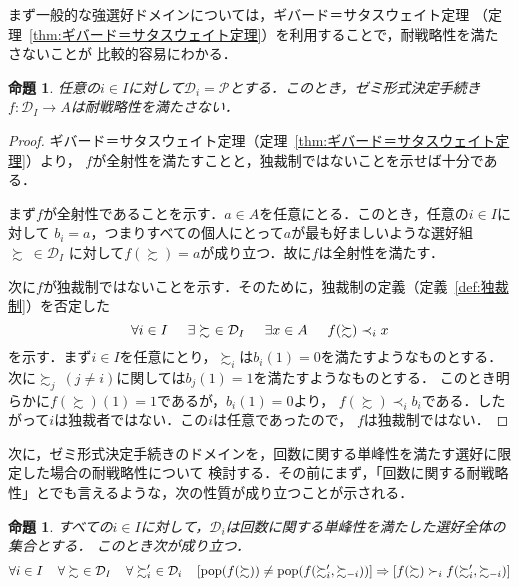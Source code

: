 \documentclass[dvipdfmx]{jsarticle}
\newtheorem{proposition}[definition]{命題}
\begin{document}
  まず一般的な強選好ドメインについては，ギバード＝サタスウェイト定理
  （定理~\ref{thm:ギバード＝サタスウェイト定理}）を利用することで，耐戦略性を満たさないことが
  比較的容易にわかる．

  \begin{proposition}
    任意の$i \in I$に対して$\mathcal{D}_i = \mathcal{P}$とする．このとき，ゼミ形式決定手続き
    $f\colon \mathcal{D}_I \to A$は耐戦略性を満たさない．
  \end{proposition}
    
  \begin{proof}
    ギバード＝サタスウェイト定理（定理~\ref{thm:ギバード＝サタスウェイト定理}）より，
    $f$が全射性を満たすことと，独裁制ではないことを示せば十分である．

    まず$f$が全射性であることを示す．$a \in A$を任意にとる．このとき，任意の$i \in I$に対して
    $b_i = a$，つまりすべての個人にとって$a$が最も好ましいような選好組$\succsim \ \in \mathcal{D}_I$
    に対して$f(\succsim) = a$が成り立つ．故に$f$は全射性を満たす．

    次に$f$が独裁制ではないことを示す．そのために，独裁制の定義（定義~\ref{def:独裁制}）を否定した
    \begin{equation*}
      \forall i \in I \hspace{5mm} \exists \succsim \ \in \mathcal{D}_I \hspace{5mm} 
      \exists x \in A \hspace{5mm} f(\succsim) \prec_i x
    \end{equation*}
    を示す．まず$i \in I$を任意にとり，$\succsim_i$は$b_i(1)=0$を満たすようなものとする．
    次に$\succsim_j\ (j \neq i)$に関しては$b_j(1) = 1$を満たすようなものとする．
    このとき明らかに$f(\succsim)(1) = 1$であるが，$b_i(1)=0$より，
    $f(\succsim) \prec_i b_i$である．したがって$i$は独裁者ではない．この$i$は任意であったので，
    $f$は独裁制ではない．
  \end{proof}

  次に，ゼミ形式決定手続きのドメインを，回数に関する単峰性を満たす選好に限定した場合の耐戦略性について
  検討する．その前にまず，「回数に関する耐戦略性」とでも言えるような，次の性質が成り立つことが示される．

  \begin{proposition}
    すべての$i \in I$に対して，$\mathcal{D}_i$は回数に関する単峰性を満たした選好全体の集合とする．
    このとき次が成り立つ．
    \begin{equation*}
      \forall i \in I \hspace{4mm} \forall \succsim \ \in \mathcal{D}_I \hspace{4mm}
      \forall \succsim'_i \ \in \mathcal{D}_i \hspace{4mm}
      [\mathrm{pop}(f(\succsim)) \neq \mathrm{pop}(f(\succsim'_i, \succsim_{-i}))]
      \Rightarrow [f(\succsim) \succ_i f(\succsim'_i, \succsim_{-i})]
    \end{equation*}
  \end{proposition}
\end{document}
